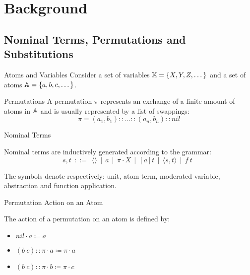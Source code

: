 \section{Background}
\subsection{Nominal Terms, Permutations and Substitutions}
\begin{frame}{Atoms and Variables}
    Consider a set of variables $\mathbb{X} = \{X, Y, Z, \dots \}$ and 
    a set of atoms $\mathbb{A} = \{a, b, c, \dots \}$.
\end{frame}

\begin{frame}{Permutations}
    A permutation $\pi$ represents an exchange of a finite amount of atoms in
    $\mathbb{A}$
    and is usually represented by a list of swappings: 
\begin{equation*}
    \pi = (a_1, b_1):: ... ::(a_n, b_n)::nil 
\end{equation*}
\end{frame}

\begin{frame}{Nominal Terms}
    \begin{definition}
    Nominal terms are inductively generated according to the grammar: 
    \begin{equation*}
        s,t \ \ ::= \ \ \langle \rangle \ \ | \ \ a \ \ | \ \ \pi \cdot X \ \ | \ \ [a]t \ \ |
                    \ \ \langle s, t \rangle \ \       | \ \ f \ t \ \   
    \end{equation*}
    \end{definition}
    The symbols denote respectively: unit, atom term, moderated variable, abstraction and function
    application.
\end{frame}

\begin{frame}{Permutation Action on an Atom}
    \begin{definition}
    The action of a permutation on an atom is defined by: 
    \begin{itemize} 
        \item $nil \cdot a \coloneqq a$ 
        \item $(b \ c):: \pi \cdot a \coloneqq \pi \cdot a$ 
        \item $(b \ c):: \pi \cdot b \coloneqq \pi \cdot c$ 
    \end{itemize}
    \end{definition}
\end{frame}

